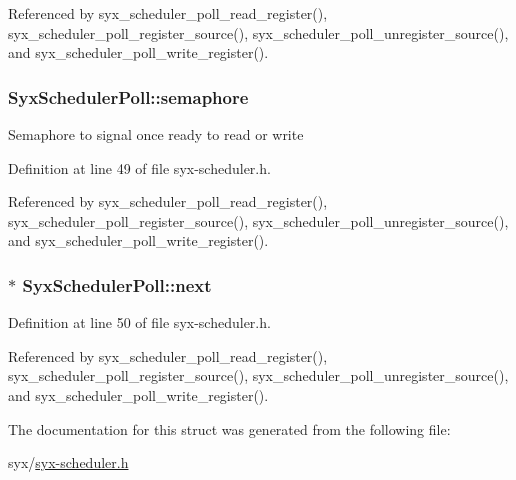 Referenced by syx\_\-scheduler\_\-poll\_\-read\_\-register(), syx\_\-scheduler\_\-poll\_\-register\_\-source(), syx\_\-scheduler\_\-poll\_\-unregister\_\-source(), and syx\_\-scheduler\_\-poll\_\-write\_\-register().\hypertarget{struct_syx_scheduler_poll_29351d80c985a867917f0d81ec6a790f}{
\subsubsection{ {\bf SyxSchedulerPoll::semaphore}}}
\label{struct_syx_scheduler_poll_29351d80c985a867917f0d81ec6a790f}


Semaphore to signal once ready to read or write 

Definition at line 49 of file syx-scheduler.h.

Referenced by syx\_\-scheduler\_\-poll\_\-read\_\-register(), syx\_\-scheduler\_\-poll\_\-register\_\-source(), syx\_\-scheduler\_\-poll\_\-unregister\_\-source(), and syx\_\-scheduler\_\-poll\_\-write\_\-register().\hypertarget{struct_syx_scheduler_poll_805f9e5a3c5ceefc63f8d054129deb55}{
\subsubsection{$\ast$ {\bf SyxSchedulerPoll::next}}}
\label{struct_syx_scheduler_poll_805f9e5a3c5ceefc63f8d054129deb55}




Definition at line 50 of file syx-scheduler.h.

Referenced by syx\_\-scheduler\_\-poll\_\-read\_\-register(), syx\_\-scheduler\_\-poll\_\-register\_\-source(), syx\_\-scheduler\_\-poll\_\-unregister\_\-source(), and syx\_\-scheduler\_\-poll\_\-write\_\-register().

The documentation for this struct was generated from the following file:\begin{CompactItemize}
\item 
syx/\hyperlink{syx-scheduler_8h}{syx-scheduler.h}\end{CompactItemize}
